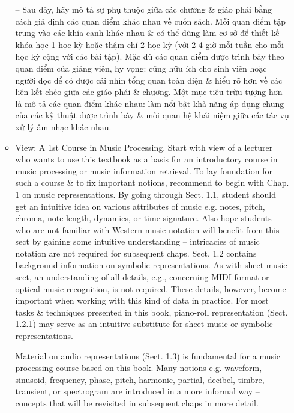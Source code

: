 \documentclass{article}
\begin{document}
\begin{itemize}
\begin{itemize}
		-- 		Sau đây, hãy mô tả sự phụ thuộc giữa các chương \& giáo phái bằng cách giả định các quan điểm khác nhau về cuốn sách. Mỗi quan điểm tập trung vào các khía cạnh khác nhau \& có thể dùng làm cơ sở để thiết kế khóa học 1 học kỳ hoặc thậm chí 2 học kỳ (với 2-4 giờ mỗi tuần cho mỗi học kỳ cộng với các bài tập). Mặc dù các quan điểm được trình bày theo quan điểm của giảng viên, hy vọng: cũng hữu ích cho sinh viên hoặc người đọc để có được cái nhìn tổng quan toàn diện \& hiểu rõ hơn về các liên kết chéo giữa các giáo phái \& chương. Một mục tiêu trừu tượng hơn là mô tả các quan điểm khác nhau: làm nổi bật khả năng áp dụng chung của các kỹ thuật được trình bày \& mối quan hệ khái niệm giữa các tác vụ xử lý âm nhạc khác nhau.
		\item {\sf View: A 1st Course in Music Processing.} Start with view of a lecturer who wants to use this textbook as a basis for an introductory course in music processing or music information retrieval. To lay foundation for such a course \& to fix important notions, recommend to begin with Chap. 1 on music representations. By going through Sect. 1.1, student should get an intuitive idea on various attributes of music e.g. notes, pitch, chroma, note length, dynamics, or time signature. Also hope students who are not familiar with Western music notation will benefit from this sect by gaining some intuitive understanding -- intricacies of music notation are not required for subsequent chaps. Sect. 1.2 contains background information on symbolic representations. As with sheet music sect, an understanding of all details, e.g., concerning MIDI format or optical music recognition, is not required. These details, however, become important when working with this kind of data in practice. For most tasks \& techniques presented in this book, piano-roll representation (Sect. 1.2.1) may serve as an intuitive substitute for sheet music or symbolic representations.
		
		Material on audio representations (Sect. 1.3) is fundamental for a music processing course based on this book. Many notions e.g. waveform, sinusoid, frequency, phase, pitch, harmonic, partial, decibel, timbre, transient, or spectrogram are introduced in a more informal way -- concepts that will be revisited in subsequent chaps in more detail.
		

\end{itemize}
\end{itemize}
\end{document}
